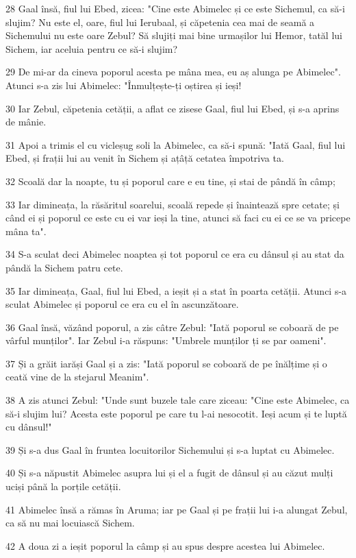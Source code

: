 \par 28 Gaal însă, fiul lui Ebed, zicea: "Cine este Abimelec și ce este Sichemul, ca să-i slujim? Nu este el, oare, fiul lui Ierubaal, și căpetenia cea mai de seamă a Sichemului nu este oare Zebul? Să slujiți mai bine urmașilor lui Hemor, tatăl lui Sichem, iar aceluia pentru ce să-i slujim?
\par 29 De mi-ar da cineva poporul acesta pe mâna mea, eu aș alunga pe Abimelec". Atunci s-a zis lui Abimelec: "Înmulțește-ți oștirea și ieși!
\par 30 Iar Zebul, căpetenia cetății, a aflat ce zisese Gaal, fiul lui Ebed, și s-a aprins de mânie.
\par 31 Apoi a trimis el cu vicleșug soli la Abimelec, ca să-i spună: "Iată Gaal, fiul lui Ebed, și frații lui au venit în Sichem și ațâță cetatea împotriva ta.
\par 32 Scoală dar la noapte, tu și poporul care e eu tine, și stai de pândă în câmp;
\par 33 Iar dimineața, la răsăritul soarelui, scoală repede și înaintează spre cetate; și când ei și poporul ce este cu ei var ieși la tine, atunci să faci cu ei ce se va pricepe mâna ta".
\par 34 S-a sculat deci Abimelec noaptea și tot poporul ce era cu dânsul și au stat da pândă la Sichem patru cete.
\par 35 Iar dimineața, Gaal, fiul lui Ebed, a ieșit și a stat în poarta cetății. Atunci s-a sculat Abimelec și poporul ce era cu el în ascunzătoare.
\par 36 Gaal însă, văzând poporul, a zis câtre Zebul: "Iată poporul se coboară de pe vârful munților". Iar Zebul i-a răspuns: "Umbrele munților ți se par oameni".
\par 37 Și a grăit iarăși Gaal și a zis: "Iată poporul se coboară de pe înălțime și o ceată vine de la stejarul Meanim".
\par 38 A zis atunci Zebul: "Unde sunt buzele tale care ziceau: "Cine este Abimelec, ca să-i slujim lui? Acesta este poporul pe care tu l-ai nesocotit. Ieși acum și te luptă cu dânsul!"
\par 39 Și s-a dus Gaal în fruntea locuitorilor Sichemului și s-a luptat cu Abimelec.
\par 40 Și s-a năpustit Abimelec asupra lui și el a fugit de dânsul și au căzut mulți uciși până la porțile cetății.
\par 41 Abimelec însă a rămas în Aruma; iar pe Gaal și pe frații lui i-a alungat Zebul, ca să nu mai locuiască Sichem.
\par 42 A doua zi a ieșit poporul la câmp și au spus despre acestea lui Abimelec.
